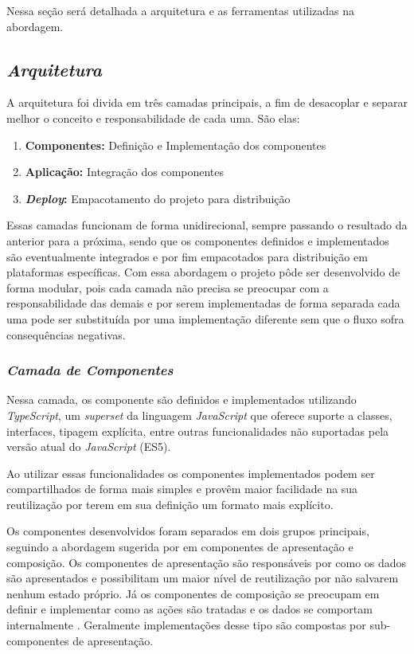 Nessa seção será detalhada a arquitetura e as ferramentas utilizadas na abordagem.

\subsection{{\it Arquitetura}}

A arquitetura foi divida em três camadas principais, a fim de desacoplar e separar melhor o conceito e responsabilidade de cada uma. São elas:

\begin{enumerate}
	\item \textbf{Componentes:} Definição e Implementação dos componentes
	\item \textbf{Aplicação:} Integração dos componentes 
	\item \textbf{\textit{Deploy}:} Empacotamento do projeto para distribuição
\end{enumerate}

Essas camadas funcionam de forma unidirecional, sempre passando o resultado da anterior para a próxima, sendo que os componentes definidos e implementados são eventualmente integrados e por fim empacotados para distribuição em plataformas específicas. Com essa abordagem o projeto pôde ser desenvolvido de forma modular, pois cada camada não precisa se preocupar com a responsabilidade das demais e por serem implementadas de forma separada cada uma pode ser substituída por uma implementação diferente sem que o fluxo sofra consequências negativas.

\subsubsection{{\it Camada de Componentes}}

Nessa camada, os componente são definidos e implementados utilizando \textit{TypeScript}, um \textit{superset} da linguagem \textit{JavaScript} que oferece suporte a classes, interfaces, tipagem explícita, entre outras funcionalidades não suportadas pela versão atual do \textit{JavaScript} (ES5).

Ao utilizar essas funcionalidades os componentes implementados podem ser compartilhados de forma mais simples e provêm maior facilidade na sua reutilização por terem em sua definição um formato mais explícito.

Os componentes desenvolvidos foram separados em dois grupos principais, seguindo a abordagem sugerida por\cite{presentContainerAbramov} em componentes de apresentação e composição. Os componentes de apresentação são responsáveis por como os dados são apresentados e possibilitam um maior nível de reutilização por não salvarem nenhum estado próprio. Já os componentes de composição se preocupam em definir e implementar como as ações são tratadas e os dados se comportam internalmente . Geralmente implementações desse tipo são compostas por sub-componentes de apresentação. 

